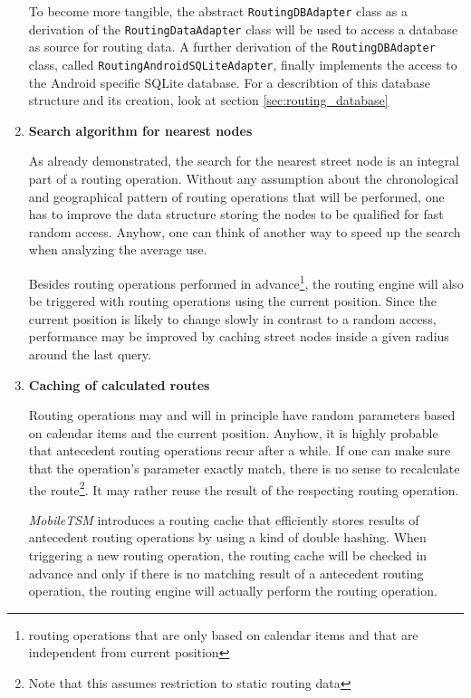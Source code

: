 \begin{enumerate}
To become more tangible, the abstract \texttt{RoutingDBAdapter} class as a derivation of the \texttt{RoutingDataAdapter} class will be used to access a database as source for routing data. A further derivation of the \texttt{RoutingDBAdapter} class, called \texttt{RoutingAndroidSQLiteAdapter}, finally implements the access to the Android specific SQLite database. For a describtion of this database structure and its creation, look at section \ref{sec:routing_database}\newline


	\item \textbf{Search algorithm for nearest nodes}

As already demonstrated, the search for the nearest street node is an integral part of a routing operation. Without any assumption about the chronological and geographical pattern of routing operations that will be performed, one has to improve the data structure storing the nodes to be qualified for fast random access. Anyhow, one can think of another way to speed up the search when analyzing the average use.\newline

Besides routing operations performed in advance\footnote{routing operations that are only based on calendar items and that are independent from current position}, the routing engine will also be triggered with routing operations using the current position. Since the current position is likely to change slowly in contrast to a random access, performance may be improved by caching street nodes inside a given radius around the last query.


	\item \textbf{Caching of calculated routes}
	
		Routing operations may and will in principle have random parameters based on calendar items and the current position. Anyhow, it is highly probable that antecedent routing operations recur after a while. If one can make sure that the operation's parameter exactly match, there is no sense to recalculate the route\footnote{Note that this assumes restriction to static routing data}. It may rather reuse the result of the respecting routing operation.\newline
		
		\emph{MobileTSM} introduces a routing cache that efficiently stores results of antecedent routing operations by using a kind of double hashing. When triggering a new routing operation, the routing cache will be checked in advance and only if there is no matching result of a antecedent routing operation, the routing engine will actually perform the routing operation.


\end{enumerate}

